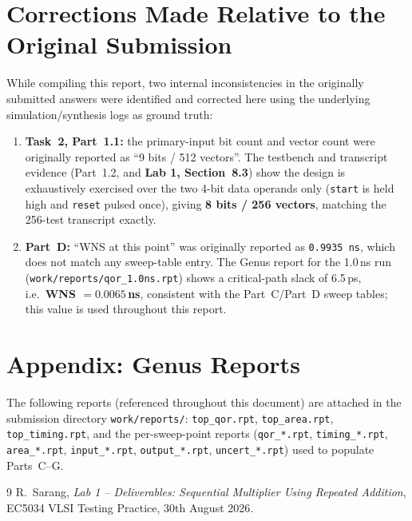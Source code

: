 \documentclass[11pt]{article}
\newcommand{\lab}[1]{\textbf{Lab 1, Section~#1}}
\begin{document}
\section*{Corrections Made Relative to the Original Submission}
While compiling this report, two internal inconsistencies in the originally submitted answers were
identified and corrected here using the underlying simulation/synthesis logs as ground truth:
\begin{enumerate}
    \item \textbf{Task~2, Part~1.1:} the primary-input bit count and vector count were originally
    reported as ``9 bits / 512 vectors''. The testbench and transcript evidence (Part~1.2, and
    \lab{8.3}) show the design is exhaustively exercised over the two 4-bit data operands only
    (\texttt{start} is held high and \texttt{reset} pulsed once), giving \textbf{8 bits / 256
    vectors}, matching the 256-test transcript exactly.
    \item \textbf{Part~D:} ``WNS at this point'' was originally reported as \texttt{0.9935\,ns},
    which does not match any sweep-table entry. The Genus report for the 1.0\,ns run
    (\texttt{work/reports/qor\_1.0ns.rpt}) shows a critical-path slack of 6.5\,ps, i.e.\
    \textbf{WNS $=0.0065$\,ns}, consistent with the Part~C/Part~D sweep tables; this value is used
    throughout this report.
\end{enumerate}

\appendix
\section{Appendix: Genus Reports}
The following reports (referenced throughout this document) are attached in the submission
directory \texttt{work/reports/}: \texttt{top\_qor.rpt}, \texttt{top\_area.rpt},
\texttt{top\_timing.rpt}, and the per-sweep-point reports (\texttt{qor\_*.rpt},
\texttt{timing\_*.rpt}, \texttt{area\_*.rpt}, \texttt{input\_*.rpt}, \texttt{output\_*.rpt},
\texttt{uncert\_*.rpt}) used to populate Parts~C--G.

\begin{thebibliography}{9}
 R.~Sarang, \emph{Lab 1 -- Deliverables: Sequential Multiplier Using Repeated
Addition}, EC5034 VLSI Testing Practice, 30th August 2026.
\end{thebibliography}
\end{document}
